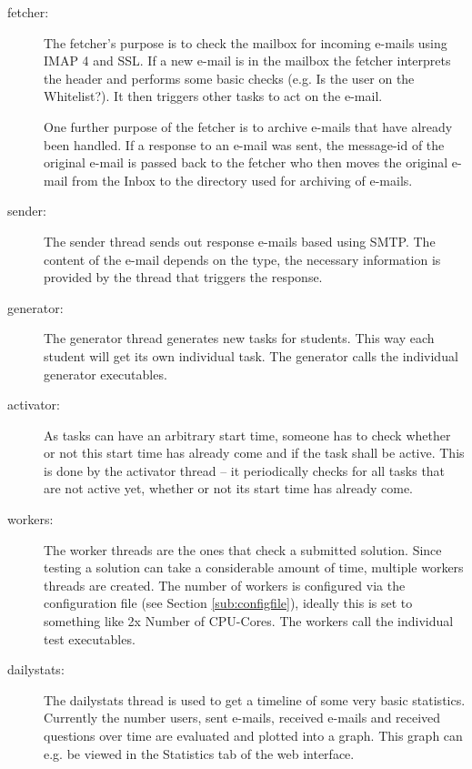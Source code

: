 \begin{description}
\item [fetcher: ] The fetcher's purpose is to check the mailbox for incoming 
    e-mails using IMAP 4 and SSL. If a new e-mail is in the mailbox the fetcher
    interprets the header and performs some basic checks (e.g. Is the user on 
    the Whitelist?). It then triggers other tasks to act on the e-mail.

    One further purpose of the fetcher is to archive e-mails that have already
    been handled. If a response to an e-mail was sent, the message-id of the
    original e-mail is passed back to the fetcher who then moves the original
    e-mail from the Inbox to the directory used for archiving of e-mails.
\item [sender: ] The sender thread sends out response e-mails based using SMTP. 
    The content of the e-mail depends on the type, the necessary information 
    is provided by the thread that triggers the response.

\item [generator: ] The generator thread generates new tasks for students. This
    way each student will get its own individual task. The generator calls the
    individual generator executables.

\item [activator: ] As tasks can have an arbitrary start time, someone has to check
    whether or not this start time has already come and if the task shall
    be active. This is done by the activator thread -- it periodically checks
    for all tasks that are not active yet, whether or not its start time
    has already come.

\item [workers: ] The worker threads are the ones that check a submitted solution.
    Since testing a solution can take a considerable amount of time, multiple
    workers threads are created. The number of workers is configured via the
    configuration file (see Section \ref{sub:configfile}), ideally this is set
    to something like 2x Number of CPU-Cores. The workers call the
    individual test executables.
\item [dailystats: ] The dailystats thread is used to get a timeline of some very
    basic statistics. Currently the number users, sent e-mails, received e-mails
    and received questions over time are evaluated and plotted into a graph.
    This graph can e.g. be viewed in the Statistics tab of the web interface.
\end{description}

